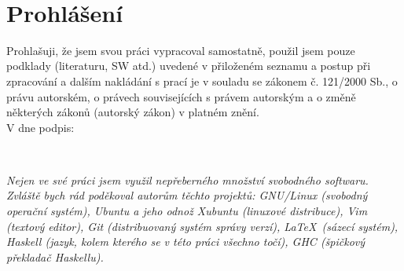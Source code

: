 \setcounter{page}{1}
\thispagestyle{empty}

\newpage


~\\[15cm]
\section*{Prohlášení}

Prohlašuji, že jsem svou práci vypracoval samostatně, použil jsem pouze
podklady (literaturu, SW atd.) uvedené v přiloženém seznamu a postup při
zpracování a dalším nakládání s prací je v souladu se zákonem č. 121/2000 Sb.,
o právu autorském, o právech souvisejících s právem autorským a o změně
některých zákonů (autorský zákon) v platném znění.\\[0.7cm]

V \makebox[3cm]{\dotfill} dne \makebox[4cm]{\dotfill}
podpis: \makebox[6cm]{\dotfill}

\newpage


~\\[15cm]
\begin{adjustwidth}{3cm}{0cm}

\textit{Nejen ve své práci jsem využil nepřeberného množství svobodného
  softwaru.  Zvláště bych rád poděkoval autorům těchto projektů:
GNU/Linux (svobodný operační systém),
Ubuntu a jeho odnož Xubuntu (linuxové distribuce),
Vim (textový editor),
Git (distribuovaný systém správy verzí),
\LaTeX\ (sázecí systém),
Haskell (jazyk, kolem kterého se v této práci všechno točí),
GHC (špičkový překladač Haskellu).
}

\end{adjustwidth}

\newpage
